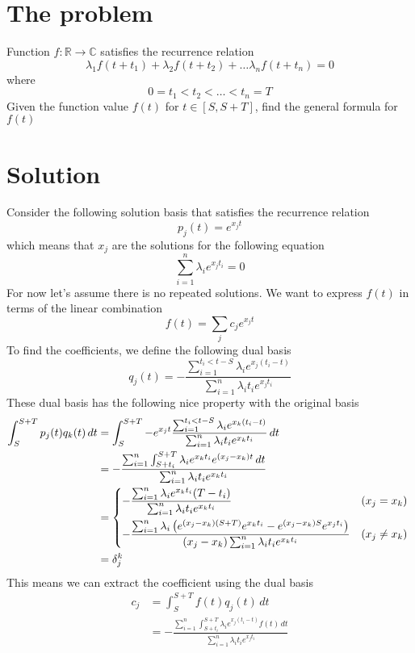 \documentclass[]{article}
\begin{document}
\newtheorem{problem}{Problem}
\newtheorem{lemma}{Property}

\section{The problem}

Function $f: \mathbb{R}\to\mathbb{C}$ satisfies the recurrence relation
\[
\lambda_1 f(t+t_1) + \lambda_2 f(t+t_2) + \dots \lambda_n f(t+t_n) = 0
\]
where
\[
0 = t_1 < t_2 <\dots <t_n = T
\]
Given the function value $f(t)$ for $t\in[S, S+T]$, find the general formula for $f(t)$

\section{Solution}

Consider the following solution basis that satisfies the recurrence relation
\[
p_j(t) = e^{x_j t}
\]
which means that $x_j$ are the solutions for the following equation
\[
\sum_{i = 1}^{n} \lambda_i e^{x_j t_i} = 0
\]
For now let's assume there is no repeated solutions. We want to express $f(t)$ in terms of the linear combination
\[
f(t) = \sum_j c_j e^{x_j t}
\]
To find the coefficients, we define the following dual basis
\[
q_j(t) = -\frac{\sum_{i=1}^{t_i<t-S} \lambda_i e^{x_j(t_i-t)} }{\sum_{i=1}^{n} \lambda_i t_i e^{x_j t_i}}
\]
These dual basis has the following nice property with the original basis
\begin{align*}
\int_{S}^{S+T} p_j(t)q_k(t)\,dt &= \int_{S}^{S+T} -e^{x_j t} \frac{\sum_{i=1}^{t_i<t-S} \lambda_i e^{x_k( t_i-t)} }{\sum_{i=1}^{n} \lambda_i t_i e^{x_k t_i}}\,dt \\
&= -\frac{\sum_{i=1}^{n} \int_{S+t_i}^{S+T}  \lambda_i e^{x_k t_i}e^{(x_j - x_k) t}\,dt }{\sum_{i=1}^{n} \lambda_i t_i e^{x_k t_i}}\\
&= \begin{dcases*}
	 -\frac{\sum_{i=1}^{n}  \lambda_i e^{x_k t_i}  (T-t_i) }{\sum_{i=1}^{n} \lambda_i t_i e^{x_k t_i}} & $(x_j =x_k)$\\
	 -\frac{\sum_{i=1}^{n} \lambda_i \left(e^{(x_j-x_k)(S+T)}e^{x_kt_i} - e^{(x_j-x_k)S}e^{x_jt_i}\right)}{(x_j - x_k)\sum_{i=1}^{n} \lambda_i t_i e^{x_k t_i}} & $(x_j \ne x_k)$
\end{dcases*}\\
&=\delta_{j}^k
\end{align*}
This means we can extract the coefficient using the dual basis
\begin{align*}
c_j &= \int_{S}^{S+T} f(t)q_j(t)\,dt \\
    &=   -\frac{\sum_{i=1}^{n} \int_{S+t_i}^{S+T} \lambda_i e^{x_j(t_i-t)}f(t)\,dt }{\sum_{i=1}^{n} \lambda_i t_i e^{x_j t_i}}
\end{align*}
\end{document}
